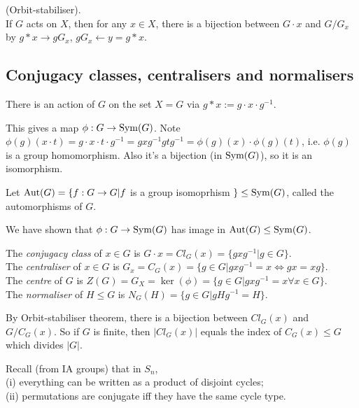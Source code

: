 \documentclass[a4paper]{article}
\begin{document}
\begin{thm} (Orbit-stabiliser).\\
If $G$ acts on $X$, then for any $x \in X$, there is a bijection between $G\cdot x$ and $G/G_x$ by $g*x \to gG_x$, $gG_x \leftarrow y=g*x$.
\end{thm}

\subsection{Conjugacy classes, centralisers and normalisers}
There is an action of $G$ on the set $X=G$ via $g*x := g\cdot x \cdot g^{-1}$.

This gives a map $\phi : G \to \operatorname{Sym}(G)$. Note $\phi(g)(x \cdot t)=g \cdot x \cdot t \cdot g^{-1} = gxg^{-1}gtg^{-1}=\phi(g)(x) \cdot \phi(g)(t)$, i.e. $\phi(g)$ is a group homomorphism. Also it's a bijection (in $\operatorname{Sym}(G)$), so it is an isomorphism.

Let $\operatorname{Aut}(G) = \{f:G \to G | f$ is a group isomoprhism $\} \leq \operatorname{Sym}(G)$, called the automorphisms of $G$.

We have shown that $\phi:G \to \operatorname{Sym}(G)$ has image in $\operatorname{Aut}(G) \leq \operatorname{Sym}(G)$.

\begin{defi}
The \emph{conjugacy class} of $x \in G$ is $G \cdot x = Cl_G(x) = \{gxg^{-1} | g \in G\}$.\\
The \emph{centraliser} of $x\in G$ is $G_x=C_G(x) = \{g \in G | gxg^{-1} = x \iff gx = xg\}$.\\
The \emph{centre} of $G$ is $Z(G) = G_X = \ker(\phi) = \{g\in G| gxg^{-1} = x \forall x \in G\}$.\\
The \emph{normaliser} of $H \leq G$ is $N_G(H) = \{ g \in G | gHg^{-1} = H\}$.
\end{defi}

By Orbit-stabiliser theorem, there is a bijection between $Cl_G(x)$ and $G / C_G(x)$. So if $G$ is finite, then $|Cl_G(x)|$ equals the index of $C_G(x) \leq G$ which divides $|G|$.

Recall (from IA groups) that in $S_n$,\\
(i) everything can be written as a product of disjoint cycles;\\
(ii) permutations are conjugate iff they have the same cycle type.
\end{document}
